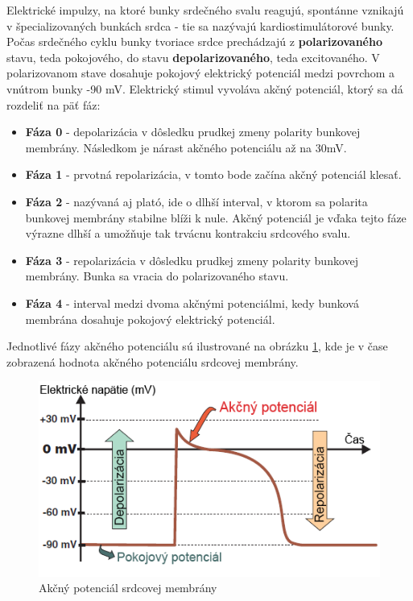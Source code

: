  Elektrické impulzy, na ktoré bunky srdečného svalu reagujú, spontánne vznikajú v špecializovaných bunkách srdca - tie sa nazývajú kardiostimulátorové bunky. Počas srdečného cyklu bunky tvoriace srdce prechádzajú z \textbf{polarizovaného} stavu, teda pokojového, do stavu \textbf{depolarizovaného}, teda excitovaného. V polarizovanom stave dosahuje pokojový elektrický potenciál medzi povrchom a vnútrom bunky -90 mV.\cite{Bada2010} Elektrický stimul vyvoláva akčný potenciál, ktorý sa dá rozdeliť na päť fáz:
\begin{itemize}
    \item \textbf{Fáza 0} - depolarizácia v dôsledku prudkej zmeny polarity bunkovej membrány. Následkom je nárast akčného potenciálu až na 30mV.
    \item \textbf{Fáza 1} - prvotná repolarizácia, v tomto bode začína akčný potenciál klesať.
    \item \textbf{Fáza 2} - nazývaná aj plató, ide o dlhší interval, v ktorom sa polarita bunkovej membrány stabilne blíži k nule. Akčný potenciál je vďaka tejto fáze výrazne dlhší a umožňuje tak trvácnu kontrakciu srdcového svalu.
    \item \textbf{Fáza 3} - repolarizácia v dôsledku prudkej zmeny polarity bunkovej membrány. Bunka sa vracia do polarizovaného stavu.
    \item \textbf{Fáza 4} - interval medzi dvoma akčnými potenciálmi, kedy bunková membrána dosahuje pokojový elektrický potenciál. 
\end{itemize}

Jednotlivé fázy akčného potenciálu sú ilustrované na obrázku \ref{fig:action_potential_voltage}, kde je v čase zobrazená hodnota akčného potenciálu srdcovej membrány.\cite{Rooke2021TheEA}\cite{Bada2010}

\begin{figure}[H]
    \centering
    \includegraphics[scale=0.45]{img/action-potential-voltage.png}
    \caption{Akčný potenciál srdcovej membrány\cite{Blahút_2017}}
    \label{fig:action_potential_voltage}
\end{figure}


